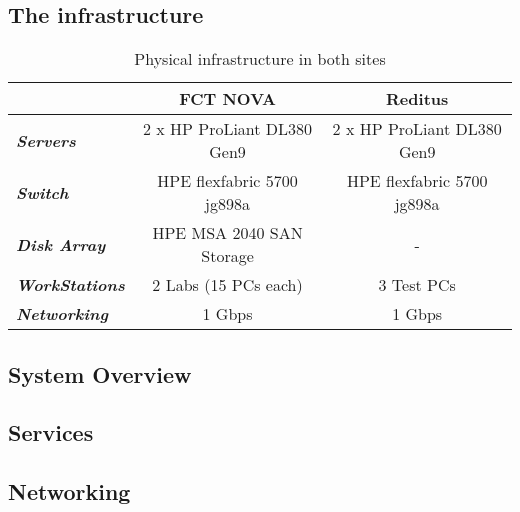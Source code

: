 \subsection{The infrastructure}
\label{sub:infrastructure}

\begin{table}[htpb]
\centering
\begin{tabular}{lcc}
\hline
                               & \textbf{FCT NOVA}          & \textbf{Reditus}           \\ \hline
\textit{\textbf{Servers}}      & 2 x HP ProLiant DL380 Gen9 & 2 x HP ProLiant DL380 Gen9 \\
\textit{\textbf{Switch}}       & HPE flexfabric 5700 jg898a & HPE flexfabric 5700 jg898a \\
\textit{\textbf{Disk Array}}   & HPE MSA 2040 SAN Storage   & -                          \\
\textit{\textbf{WorkStations}} & 2 Labs (15 PCs each)       & 3 Test PCs                 \\
\textit{\textbf{Networking}}   & 1 Gbps                     & 1 Gbps                     \\ \hline
\end{tabular}
\caption{Physical infrastructure in both sites}
\end{table}


\subsection{System Overview}
\label{sub:system_overview}

\subsection{Services}
\label{sub:cache_services}


\subsection{Networking}
\label{sub:cache_networking}

